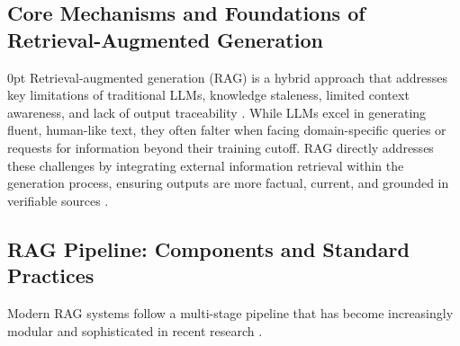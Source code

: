 \begin{spacing}{1.5}
\section{Core Mechanisms and Foundations of Retrieval-Augmented Generation}\setlength{\parskip}
{0pt}
Retrieval-augmented generation (RAG) is a hybrid approach that addresses key limitations of traditional LLMs, knowledge staleness, limited context awareness, and lack of output traceability \parencite{vaibhav_retrieval-augmented_2025,gao_retrieval-augmented_2024, gupta_comprehensive_2024}. While LLMs excel in generating fluent, human-like text, they often falter when facing domain-specific queries or requests for information beyond their training cutoff. RAG directly addresses these challenges by integrating external information retrieval within the generation process, ensuring outputs are more factual, current, and grounded in verifiable sources \citep{wang_searching_2024}.

\subsection{RAG Pipeline: Components and Standard Practices}
Modern RAG systems follow a multi-stage pipeline that has become increasingly modular and sophisticated in recent research \citep{vaibhav_retrieval-augmented_2025,wang_searching_2024}. 


\end{spacing}
